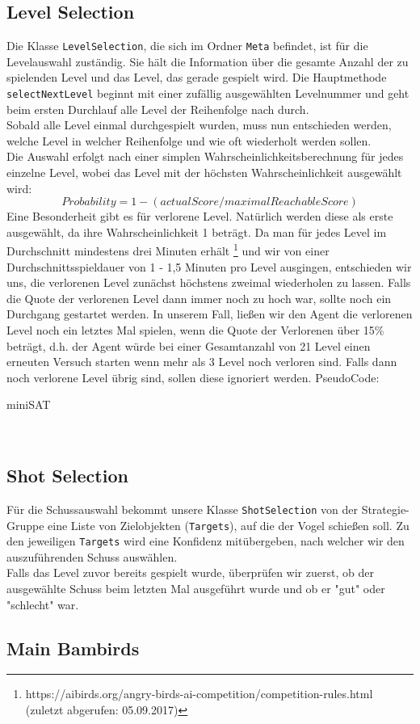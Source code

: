 \subsection{Level Selection}
Die Klasse \texttt{LevelSelection}, die sich im Ordner \texttt{Meta} befindet, ist für die Levelauswahl zuständig. Sie hält die Information über die gesamte Anzahl der zu spielenden Level und das Level, das gerade gespielt wird. Die Hauptmethode \texttt{selectNextLevel} beginnt mit einer zufällig ausgewählten Levelnummer und geht beim ersten Durchlauf alle Level der Reihenfolge nach durch. \\
Sobald alle Level einmal durchgespielt wurden, muss nun entschieden werden, welche Level in welcher Reihenfolge und wie oft wiederholt werden sollen. \\
Die Auswahl erfolgt nach einer simplen Wahrscheinlichkeitsberechnung für jedes einzelne Level, wobei das Level mit der höchsten Wahrscheinlichkeit ausgewählt wird: \\
$$ Probability = 1 - ( actualScore / maximalReachableScore ) $$
Eine Besonderheit gibt es für verlorene Level. Natürlich werden diese als erste ausgewählt, da ihre Wahrscheinlichkeit 1 beträgt. Da man für jedes Level im Durchschnitt mindestens drei Minuten erhält \footnote{https://aibirds.org/angry-birds-ai-competition/competition-rules.html (zuletzt abgerufen: 05.09.2017)} und wir von einer Durchschnittsspieldauer von 1 - 1,5 Minuten pro Level ausgingen, entschieden wir uns, die verlorenen Level zunächst höchstens zweimal wiederholen zu lassen. Falls die Quote der verlorenen Level dann immer noch zu hoch war, sollte noch ein Durchgang gestartet werden. In unserem Fall, ließen wir den Agent die verlorenen Level noch ein letztes Mal spielen, wenn die Quote der Verlorenen über 15\% beträgt, d.h. der Agent würde bei einer Gesamtanzahl von 21 Level einen erneuten Versuch starten wenn mehr als 3 Level noch verloren sind. Falls dann noch verlorene Level übrig sind, sollen diese ignoriert werden.
PseudoCode: \\
\begin{algorithm}
  \begin{algorithmic}
    \Loop 
    \EndLoop
  \end{algorithmic}
  \caption{miniSAT\label{lss}}
\end{algorithm}

\\


\subsection{Shot Selection}
Für die Schussauswahl bekommt unsere Klasse \texttt{ShotSelection} von der Strategie-Gruppe eine Liste von Zielobjekten (\texttt{Targets}), auf die der Vogel schießen soll. Zu den jeweiligen \texttt{Targets} wird eine Konfidenz mitübergeben, nach welcher wir den auszuführenden Schuss auswählen. \\
Falls das Level zuvor bereits gespielt wurde, überprüfen wir zuerst, ob der ausgewählte Schuss beim letzten Mal ausgeführt wurde und ob er "gut" oder "schlecht" war.

\subsection{Main Bambirds}
